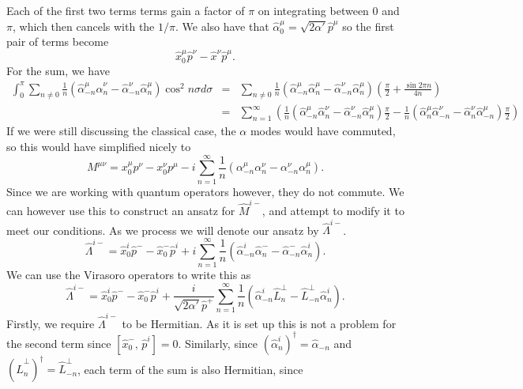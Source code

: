 \documentclass[a4paper,12pt]{article}
\numberwithin{equation}{section}
\begin{document}
Each of the first two terms terms gain a factor of $\pi$ on integrating between 0 and $\pi$, which then cancels with the $1/\pi$. We also have that $\hat{\alpha}_0^\mu = \sqrt{2\alpha'}\hat{p}^\mu$ so the first pair of terms become
\begin{equation}
\hat{x}_0^\mu\hat{p}^\nu-\hat{x}^\nu\hat{p}^\mu.
\end{equation}
For the sum, we have
\begin{eqnarray*}
\int_0^\pi\sum_{n\ne0}\frac{1}{n}\left(\hat{\alpha}_{-n}^\mu\hat{\alpha}_{n}^\nu-\hat{\alpha}_{-n}^\nu\hat{\alpha}_{n}^\mu\right)\cos^2n\sigma d\sigma &=&\sum_{n\ne0}\frac{1}{n}\left(\hat{\alpha}_{-n}^\mu\hat{\alpha}_n^\mu-\hat{\alpha}_{-n}^\nu\hat{\alpha}_{n}^\mu\right)\left(\frac{\pi}{2} + \frac{\sin 2\pi n}{4 n}\right)\\
&=& \sum_{n=1}^\infty\left(\frac{1}{n}\left(\hat{\alpha}_{-n}^\mu\hat{\alpha}_{n}^\nu-\hat{\alpha}_{-n}^\nu\hat{\alpha}_{n}^\mu\right)\frac{\pi}{2} - \frac{1}{n}\left(\hat{\alpha}_{n}^\mu\hat{\alpha}_{-n}^\nu-\hat{\alpha}_{n}^\nu\hat{\alpha}_{-n}^\mu\right)\frac{\pi}{2} \right)
\end{eqnarray*} 
If we were still discussing the classical case, the $\alpha$ modes would have commuted, so this would have simplified nicely to
\begin{equation}
M^{\mu\nu} = x_0^\mu p^\nu-x_0^\nu p^\mu -i\sum_{n=1}^\infty\frac{1}{n}\left(\alpha_{-n}^\mu\alpha_n^\nu-\alpha_{-n}^\nu\alpha_{n}^\mu\right).
\end{equation}
Since we are working with quantum operators however, they do not commute. We can however use this to construct an ansatz for $\hat{M}^{i-}$, and attempt to modify it to meet our conditions. As we process we will denote our ansatz by $\hat{\Lambda}^{i-}$.
\begin{equation}
\hat{\Lambda}^{i-} = \hat{x}_0^i \hat{p}^--\hat{x}_0^- \hat{p}^i +i\sum_{n=1}^\infty\frac{1}{n}\left(\hat{\alpha}_{-n}^i\hat{\alpha}_n^--\hat{\alpha}_{-n}^-\hat{\alpha}_{n}^i\right).
\end{equation}
We can use the Virasoro operators to write this as
\begin{equation}
\hat{\Lambda}^{i-} = \hat{x}_0^i \hat{p}^--\hat{x}_0^- \hat{p}^i +\frac{i}{\sqrt{2\alpha'}\hat{p}^+}\sum_{n=1}^\infty\frac{1}{n}\left(\hat{\alpha}_{-n}^i\hat{L}_n^\perp-\hat{L}_{-n}^\perp\hat{\alpha}_{n}^i\right).
\end{equation}
Firstly, we require $\hat{\Lambda}^{i-}$ to be Hermitian. As it is set up this is not a problem for the second term since $[\hat{x}_0^-,\,\hat{p}^i]=0$. Similarly, since $(\hat{\alpha}_n^i)^\dagger = \hat{\alpha}_{-n}$ and $(\hat{L}_n^\perp)^\dagger = \hat{L}_{-n}^\perp$, each term of the sum is also Hermitian, since
\end{document}
